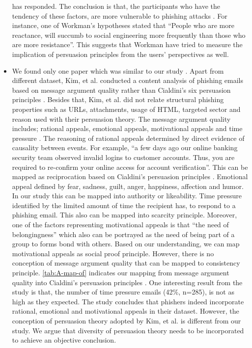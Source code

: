 \begin{itemize}
has responded. The conclusion is that, the participants who have the
tendency of these factors, are more vulnerable to phishing attacks
\citep{workman:2008}. For instance, one of Workman's hypotheses stated
that ``People who are more reactance, will succumb to social engineering
more frequently than those who are more resistance''. This suggests
that Workman have tried to measure the implication of persuasion principles
from the users' perspectives as well. 
\item We found only one paper which was similar to our study \citep{kim2013understanding}.
Apart from different dataset, Kim, et al. conducted a content analysis
of phishing emails based on message argument quality rather than Cialdini's
six persuasion principles \citep{kim2013understanding}\citep{cialdini:2001}.
Besides that, Kim, et al. did not relate structural phishing properties
such as URLs, attachments, usage of HTML, targeted sector and reason
used with their persuasion theory. The message argument quality includes;
rational appeals, emotional appeals, motivational appeals and time
pressure \citep{kim2013understanding}. The reasoning of rational
appeals determined by direct evidence of causality between events.
For example, \textquotedblleft a few days ago our online banking security
team observed invalid logins to customer accounts. Thus, you are required
to re-confirm your online access for account verification\textquotedblright .
This can be mapped as reciprocation based on Cialdini's persuasion
principles \citep{cialdini:2001}. Emotional appeal defined by fear,
sadness, guilt, anger, happiness, affection and humor. In our study
this can be mapped into authority or likeability. Time pressure identified
by the limited amount of time the recipient has, to respond to a phishing
email. This also can be mapped into scarcity principle. Moreover,
one of the factors representing motivational appeals is that ``the
need of belongingness'' which also can be portrayed as the need of
being part of a group to forms bond with others. Based on our understanding,
we can map motivational appeals as social proof principle. However,
there is no conception of message argument quality that can be mapped
to consistency principle. \autoref{tab:A-map-of} indicates our mapping
from message argument quality into Cialdini's persuasion principles
\citep{cialdini:2001}. One interesting result from the study is that,
the number of time pressure emails (42\%, n=285), is not as high as
they expected. The study concludes that phishers indeed incorporate
rational, emotional and motivational appeals in their dataset. However,
the conception of persuasion theory adopted by Kim, et al. is different
from our study. We argue that diversity of persuasion theory needs
to be incorporated to achieve an objective conclusion. 
\end{itemize}
